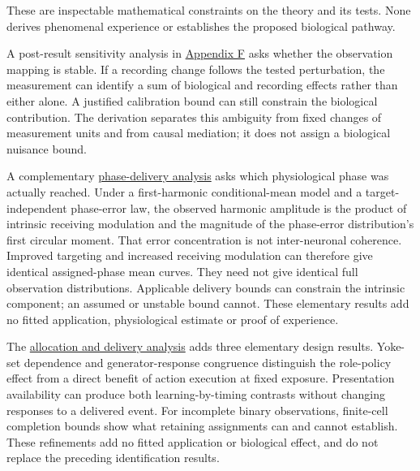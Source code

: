 \documentclass[
  american,
  11pt,
  letterpaper,
]{article}
\begin{document}
These are inspectable mathematical constraints on the theory and its tests. None derives phenomenal experience or establishes the proposed biological pathway.

A post-result sensitivity analysis in \href{https://raw.githubusercontent.com/v5ma/v5ma.github.io/master/papers/companions/learning-to-feel-v1.0/Learning-to-Feel-Technical-Supplement-v1.0.pdf\#appendix-f}{Appendix F} asks whether the observation mapping is stable. If a recording change follows the tested perturbation, the measurement can identify a sum of biological and recording effects rather than either alone. A justified calibration bound can still constrain the biological contribution. The derivation separates this ambiguity from fixed changes of measurement units and from causal mediation; it does not assign a biological nuisance bound.

A complementary \href{https://raw.githubusercontent.com/v5ma/v5ma.github.io/master/papers/companions/learning-to-feel-v1.0/Learning-to-Feel-Technical-Supplement-v1.0.pdf\#appendix-g}{phase-delivery analysis} asks which physiological phase was actually reached. Under a first-harmonic conditional-mean model and a target-independent phase-error law, the observed harmonic amplitude is the product of intrinsic receiving modulation and the magnitude of the phase-error distribution's first circular moment. That error concentration is not inter-neuronal coherence. Improved targeting and increased receiving modulation can therefore give identical assigned-phase mean curves. They need not give identical full observation distributions. Applicable delivery bounds can constrain the intrinsic component; an assumed or unstable bound cannot. These elementary results add no fitted application, physiological estimate or proof of experience.

The \href{https://raw.githubusercontent.com/v5ma/v5ma.github.io/master/papers/companions/learning-to-feel-v1.0/Learning-to-Feel-Technical-Supplement-v1.0.pdf\#appendix-i}{allocation and delivery analysis} adds three elementary design results. Yoke-set dependence and generator-response congruence distinguish the role-policy effect from a direct benefit of action execution at fixed exposure. Presentation availability can produce both learning-by-timing contrasts without changing responses to a delivered event. For incomplete binary observations, finite-cell completion bounds show what retaining assignments can and cannot establish. These refinements add no fitted application or biological effect, and do not replace the preceding identification results.
\end{document}
